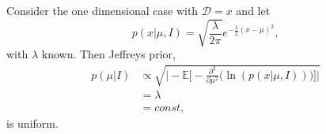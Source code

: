 \begin{example}
	\label{ex:gaus1}
	Consider the one dimensional case with $\mathcal{D}=x$ and let 
	\begin{equation}
		p(x|\mu,I)=\sqrt{\frac{\lambda}{2\pi}} e^{-\frac{\lambda}{2}(x-\mu)^2},
	\end{equation}
	with $\lambda$ known. Then Jeffreys prior,
	\begin{equation}
		\begin{split}
			p(\mu|I)&\propto\sqrt{\bigg|-\mathbb{E}\bigg[-\frac{\partial^2}{\partial \mu^2}\bigg(\ln(p(x|\mu,I))\bigg)\bigg]\bigg|}\\
			&=\lambda\\
			&=const,
		\end{split}
	\end{equation}
	is uniform.
\end{example}


